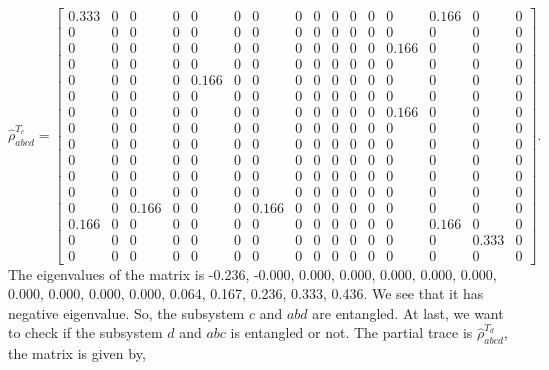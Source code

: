 \documentclass{amsart}
\theoremstyle{plain}
\theoremstyle{definition}
\theoremstyle{plain}
\begin{document}
\begin{equation*}
	\hat{\rho}^{T_c}_{abcd}= \left[\begin{array}{cccccccccccccccc}0.333 & 0 & 0 & 0 & 0 & 0 & 0 & 0 & 0 & 0 & 0 & 0 & 0 & 0.166 & 0 & 0\\0 & 0 & 0 & 0 & 0 & 0 & 0 & 0 & 0 & 0 & 0 & 0 & 0 & 0 & 0 & 0\\0 & 0 & 0 & 0 & 0 & 0 & 0 & 0 & 0 & 0 & 0 & 0 & 0.166 & 0 & 0 & 0\\0 & 0 & 0 & 0 & 0 & 0 & 0 & 0 & 0 & 0 & 0 & 0 & 0 & 0 & 0 & 0\\0 & 0 & 0 & 0 & 0.166 & 0 & 0 & 0 & 0 & 0 & 0 & 0 & 0 & 0 & 0 & 0\\0 & 0 & 0 & 0 & 0 & 0 & 0 & 0 & 0 & 0 & 0 & 0 & 0 & 0 & 0 & 0\\0 & 0 & 0 & 0 & 0 & 0 & 0 & 0 & 0 & 0 & 0 & 0 & 0.166 & 0 & 0 & 0\\0 & 0 & 0 & 0 & 0 & 0 & 0 & 0 & 0 & 0 & 0 & 0 & 0 & 0 & 0 & 0\\0 & 0 & 0 & 0 & 0 & 0 & 0 & 0 & 0 & 0 & 0 & 0 & 0 & 0 & 0 & 0\\0 & 0 & 0 & 0 & 0 & 0 & 0 & 0 & 0 & 0 & 0 & 0 & 0 & 0 & 0 & 0\\0 & 0 & 0 & 0 & 0 & 0 & 0 & 0 & 0 & 0 & 0 & 0 & 0 & 0 & 0 & 0\\0 & 0 & 0 & 0 & 0 & 0 & 0 & 0 & 0 & 0 & 0 & 0 & 0 & 0 & 0 & 0\\0 & 0 & 0.166 & 0 & 0 & 0 & 0.166 & 0 & 0 & 0 & 0 & 0 & 0 & 0 & 0 & 0\\0.166 & 0 & 0 & 0 & 0 & 0 & 0 & 0 & 0 & 0 & 0 & 0 & 0 & 0.166 & 0 & 0\\0 & 0 & 0 & 0 & 0 & 0 & 0 & 0 & 0 & 0 & 0 & 0 & 0 & 0 & 0.333 & 0\\0 & 0 & 0 & 0 & 0 & 0 & 0 & 0 & 0 & 0 & 0 & 0 & 0 & 0 & 0 & 0\end{array}\right]
	.
\end{equation*}
The eigenvalues of the matrix is -0.236, -0.000, 0.000, 0.000, 0.000, 0.000, 0.000, 0.000, 0.000, 0.000, 0.000, 0.064, 0.167, 0.236, 0.333, 0.436. We see that it has negative eigenvalue. So, the subsystem $c$ and $abd$ are entangled. At last, we want to check if the subsystem $d$ and $abc$ is entangled or not. The partial trace is $\hat{\rho}^{T_d}_{abcd}$, the matrix is given by,
\end{document}
